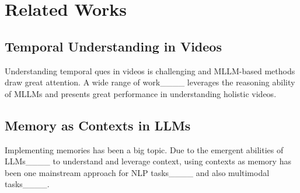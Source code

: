 \section{Related Works}
\subsection{Temporal Understanding in Videos}
Understanding temporal ques in videos is challenging and MLLM-based methods draw great attention. A wide range of work____ leverages the reasoning ability of MLLMs and presents great performance in understanding holistic videos.

\subsection{Memory as Contexts in LLMs} Implementing memories has been a big topic. Due to the emergent abilities of LLMs____ to understand and leverage context, using contexts as memory has been one mainstream approach for NLP tasks____ and also multimodal tasks____.